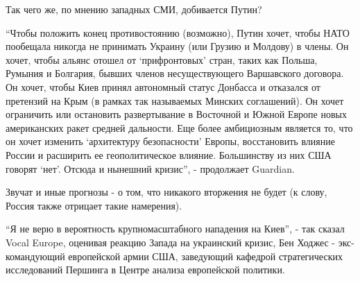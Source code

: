 \begin{multicols}{3}
Так чего же, по мнению западных СМИ, добивается Путин?

\enquote{Чтобы положить конец противостоянию (возможно), Путин хочет, чтобы НАТО
пообещала никогда не принимать Украину (или Грузию и Молдову) в члены. Он
хочет, чтобы альянс отошел от \enquote{прифронтовых} стран, таких как Польша, Румыния и
Болгария, бывших членов несуществующего Варшавского договора. Он хочет, чтобы
Киев принял автономный статус Донбасса и отказался от претензий на Крым (в
рамках так называемых Минских соглашений). Он хочет ограничить или остановить
развертывание в Восточной и Южной Европе новых американских ракет средней
дальности. Еще более амбициозным является то, что он хочет изменить
\enquote{архитектуру безопасности} Европы, восстановить влияние России и расширить ее
геополитическое влияние. Большинству из них США говорят \enquote{нет}. Отсюда и
нынешний кризис}, - продолжает Guardian.

Звучат и иные прогнозы - о том, что никакого вторжения не будет (к слову,
Россия также отрицает такие намерения). 

\enquote{Я не верю в вероятность крупномасштабного нападения на Киев}, - так
сказал Vocal Europe, оценивая реакцию Запада на украинский кризис, Бен Ходжес -
экс-командующий европейской армии США, заведующий кафедрой стратегических
исследований Першинга в Центре анализа европейской политики.


\end{multicols} %
